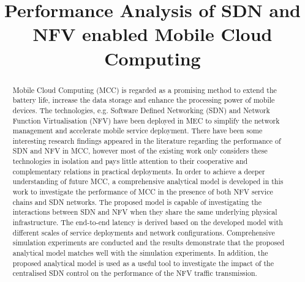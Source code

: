 \documentclass[conference]{IEEEtran}
\begin{document}
\title{Performance Analysis of SDN and NFV enabled Mobile Cloud Computing}

\author{
}
 
\maketitle

\begin{abstract}
Mobile Cloud Computing (MCC) is regarded as a promising method to extend the battery life, increase the data storage and enhance the processing power of mobile devices. The technologies, e.g. Software Defined Networking (SDN) and Network Function Virtualisation (NFV) have been deployed in MEC to simplify the network management and accelerate mobile service deployment. There have been some interesting research findings appeared in the literature regarding the performance of SDN and NFV in MCC, however most of the existing work only considers these technologies in isolation and pays little attention to their cooperative and complementary relations in practical deployments.  In order to achieve a deeper understanding of future MCC, a comprehensive analytical model is developed in this work to investigate the performance of MCC in the presence of both NFV service chains and SDN networks. The proposed model is capable of investigating the interactions between SDN and NFV when they share the same underlying physical infrastructure. The end-to-end latency is derived based on the developed model with different scales of service deployments and network configurations. Comprehensive simulation experiments are conducted and the results demonstrate that the proposed analytical model matches well with the simulation experiments. In addition, the proposed analytical model is used as a useful tool to investigate the impact of the centralised SDN control on the performance of the NFV traffic transmission. 
\end{abstract}













\end{document}
